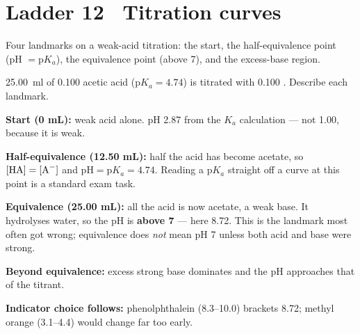 \documentclass{apchem-worksheet}
\begin{document}
\section*{\sffamily Ladder 12 \textbullet\ Titration curves}

Four landmarks on a weak-acid titration: the start, the
half-equivalence point (pH $= \mathrm{p}K_a$), the equivalence point
(above 7), and the excess-base region.

\begin{workedexample}
\SI{25.00}{\milli\litre} of \SI{0.100}{\Molar} acetic acid
($\mathrm{p}K_a = 4.74$) is titrated with \SI{0.100}{\Molar} .
Describe each landmark.

\textbf{Start (0 mL):} weak acid alone. pH \num{2.87} from the $K_a$
calculation --- not \num{1.00}, because it is weak.

\textbf{Half-equivalence (12.50 mL):} half the acid has become acetate, so
$[\ce{HA}] = [\ce{A-}]$ and
$\text{pH} = \mathrm{p}K_a = \mathbf{4.74}$. Reading a
$\mathrm{p}K_a$ straight off a curve at this point is a standard exam
task.

\textbf{Equivalence (25.00 mL):} all the acid is now acetate, a weak base.
It hydrolyses water, so the pH is \textbf{above 7} --- here \num{8.72}.
This is the landmark most often got wrong; equivalence does \emph{not}
mean pH 7 unless both acid and base were strong.

\textbf{Beyond equivalence:} excess strong base dominates and the pH
approaches that of the titrant.

\textbf{Indicator choice follows:} phenolphthalein (8.3--10.0) brackets
\num{8.72}; methyl orange (3.1--4.4) would change far too early.
\end{workedexample}
\end{document}
